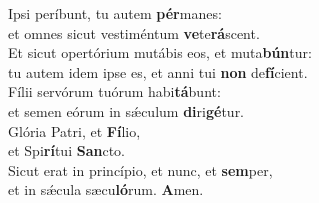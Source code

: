 \oddverse Ipsi períbunt, tu autem \textbf{pér}manes:~\*\\
\oddverse et omnes sicut vestiméntum \textbf{ve}te\textbf{rá}scent.\\
\evenverse Et sicut opertórium mutábis eos, et muta\textbf{bún}tur:~\*\\
\evenverse tu autem idem ipse es, et anni tui \textbf{non} de\textbf{fí}cient.\\
\oddverse Fílii servórum tuórum habi\textbf{tá}bunt:~\*\\
\oddverse et semen eórum in sǽculum \textbf{di}ri\textbf{gé}tur.\\
\evenverse Glória Patri, et \textbf{Fí}lio,~\*\\
\evenverse et Spi\textbf{rí}tui \textbf{San}cto.\\
\oddverse Sicut erat in princípio, et nunc, et \textbf{sem}per,~\*\\
\oddverse et in sǽcula sæcu\textbf{ló}rum. \textbf{A}men.\\
